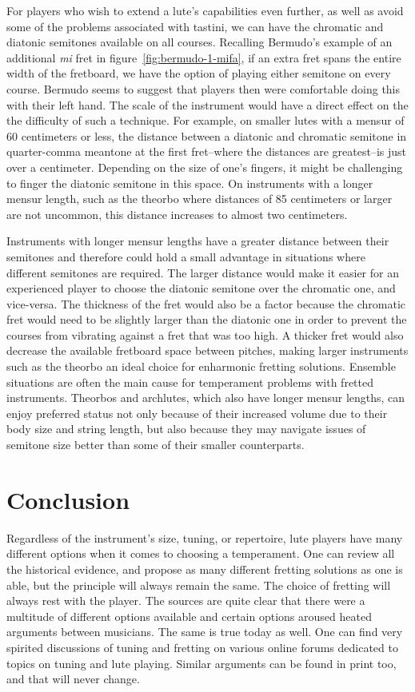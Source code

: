 For players who wish to extend a lute's capabilities even further, as well as avoid
some of the problems associated with tastini, we can have the chromatic and diatonic
semitones available on all courses. Recalling Bermudo's example of an additional
\textit{mi} fret in figure~\ref{fig:bermudo-1-mifa}, if an extra fret spans the entire
width of the fretboard, we have the option of playing either semitone on every course.
Bermudo seems to suggest that players then were comfortable doing this with their left
hand.  The scale of the instrument would have a direct effect on the the difficulty of
such a technique.  For example, on smaller lutes with a mensur of 60 centimeters or
less, the distance between a diatonic and chromatic semitone in quarter-comma meantone
at the first fret--where the distances are greatest--is just over a centimeter.
Depending on the size of one's fingers, it might be challenging to finger the diatonic
semitone in this space.  On instruments with a longer mensur length, such as the
theorbo where distances of 85 centimeters or larger are not uncommon, this distance
increases to almost two centimeters.

Instruments with longer mensur lengths have a greater distance between their semitones
and therefore could hold a small advantage in situations where different semitones are
required. The larger distance would make it easier for an experienced player to choose
the diatonic semitone over the chromatic one, and vice-versa. The thickness of the fret
would also be a factor because the chromatic fret would need to be slightly larger than
the diatonic one in order to prevent the courses from vibrating against a fret that was
too high.  A thicker fret would also decrease the available fretboard space between
pitches, making larger instruments such as the theorbo an ideal choice for enharmonic
fretting solutions.  Ensemble situations are often the main cause for temperament
problems with fretted instruments.  Theorbos and archlutes, which also have longer
mensur lengths, can enjoy preferred status not only because of their increased volume
due to their body size and string length, but also because they may navigate issues of
semitone size better than some of their smaller counterparts.

\section{Conclusion}

Regardless of the instrument's size, tuning, or repertoire, lute players have many
different options when it comes to choosing a temperament.  One can review all the
historical evidence, and propose as many different fretting solutions as one is able,
but the principle will always remain the same. The choice of fretting will always rest
with the player. The sources are quite clear that there were a multitude of different
options available and certain options aroused heated arguments between musicians. The
same is true today as well. One can find very spirited discussions of tuning and
fretting on various online forums dedicated to topics on tuning and lute playing.
Similar arguments can be found in print too, and that will never change. \autocite{DD:4}

